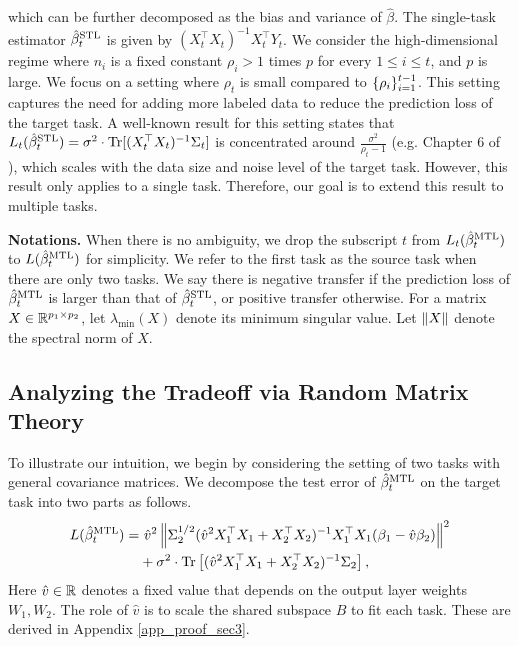 which can be further decomposed as the bias and variance of $\hat{\beta}$.
The single-task estimator $\hat{\beta}_t^{\text{STL}}$ is given by $(X_t^{\top}X_t)^{-1}X_t^{\top}Y_t$.
We consider the high-dimensional regime where $n_i$ is a fixed constant $\rho_i > 1$ times $p$ for every $1\le i\le t$, and $p$ is large.
We focus on a setting where $\rho_t$ is small compared to $\{\rho_i\}_{i=1}^{t-1}$.
This setting captures the need for adding more labeled data to reduce the prediction loss of the target task.
A well-known result for this setting states that $L_t(\hat{\beta}_t^{\text{STL}}) = \sigma^2 \cdot \operatorname{Tr}[(X_t^{\top}X_t)^{-1}\Sigma_t]$ is concentrated around $\frac {\sigma^2} {\rho_t - 1}$ (e.g. Chapter 6 of \cite{S07}), which scales with the data size and noise level of the target task.
However, this result only applies to a single task.
Therefore, our goal is to extend this result to multiple tasks.

\textbf{Notations.}
When there is no ambiguity, we drop the subscript $t$ from $L_t(\hat{\beta}_t^{\text{MTL}})$ to $L(\hat{\beta}_t^{\text{MTL}})$ for simplicity.
We refer to the first task as the source task when there are only two tasks.
We say there is negative transfer if the prediction loss of $\hat{\beta}_t^{\text{MTL}}$ is larger than that of $\hat{\beta}_t^{\text{STL}}$, or positive transfer otherwise.
For a matrix $X\in\mathbb{R}^{p_1\times p_2}$, let $\lambda_{\min}(X)$ denote its minimum singular value.
Let $\|X\|$ denote the spectral norm of $X$.

\subsection{Analyzing the Tradeoff via Random Matrix Theory}

To illustrate our intuition, we begin by considering the setting of two tasks with general covariance matrices.
We decompose the test error of $\hat{\beta}_{t}^{\text{MTL}}$ on the target task into two parts as follows.
\begin{align}
	L(\hat{\beta}_t^{\text{MTL}}) =& ~ \hat{v}^2 \left\| \Sigma_2^{1/2} (\hat{v}^2 X_1^{\top}X_1 + X_2^{\top}X_2)^{-1}X_1^{\top}X_1 (\beta_1 - \hat{v}\beta_2) \right\|^2 \label{eq_te_model_shift} \\
	&+ \sigma^2\cdot \operatorname{Tr}\left[(\hat{v}^2 X_1^{\top}X_1 + X_2^{\top}X_2)^{-1}\Sigma_2\right], \label{eq_te_var}
\end{align}
Here $\hat{v}\in\mathbb{R}$ denotes a fixed value that depends on the output layer weights $W_1, W_2$.
The role of $\hat{v}$ is to scale the shared subspace $B$ to fit each task.
These are derived in Appendix \ref{app_proof_sec3}.

